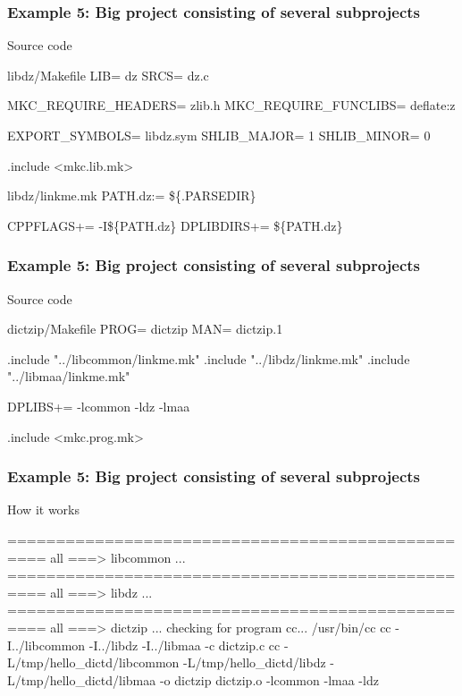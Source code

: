 \documentclass[hyperref={colorlinks=true}]{beamer}
\begin{document}
\begin{frame}[fragile]
  \frametitle{Example 5: Big project consisting of several subprojects}

  \begin{block}{Source code}
  \begin{Code}{libdz/Makefile}
LIB=            dz
SRCS=           dz.c

MKC_REQUIRE_HEADERS=    zlib.h
MKC_REQUIRE_FUNCLIBS=   deflate:z

EXPORT_SYMBOLS=         libdz.sym
SHLIB_MAJOR=            1
SHLIB_MINOR=            0

.include <mkc.lib.mk>
  \end{Code}
  \begin{Code}{libdz/linkme.mk}
PATH.dz:=       \$\{.PARSEDIR\}

CPPFLAGS+=      -I\$\{PATH.dz\}
DPLIBDIRS+=     \$\{PATH.dz\}
  \end{Code}
  \end{block}
\end{frame}

\begin{frame}[fragile]
  \frametitle{Example 5: Big project consisting of several subprojects}

  \begin{block}{Source code}
  \begin{Code}{dictzip/Makefile}
PROG=   dictzip
MAN=    dictzip.1

.include "../libcommon/linkme.mk"
.include "../libdz/linkme.mk"
.include "../libmaa/linkme.mk"

DPLIBS+=        -lcommon -ldz -lmaa

.include <mkc.prog.mk>
  \end{Code}
  \end{block}
\end{frame}

\begin{frame}[fragile]
  \frametitle{Example 5: Big project consisting of several subprojects}

  \begin{block}{How it works}
  \begin{CodeNoLabel}
==================================================
all ===> libcommon
...
==================================================
all ===> libdz
...
==================================================
all ===> dictzip
...
checking for program cc... /usr/bin/cc
cc   -I../libcommon -I../libdz -I../libmaa  -c dictzip.c
cc -L/tmp/hello_dictd/libcommon -L/tmp/hello_dictd/libdz
   -L/tmp/hello_dictd/libmaa  -o dictzip
   dictzip.o -lcommon -lmaa -ldz
\prompt{\$}
  \end{CodeNoLabel}
  \end{block}
\end{frame}
\end{document}
